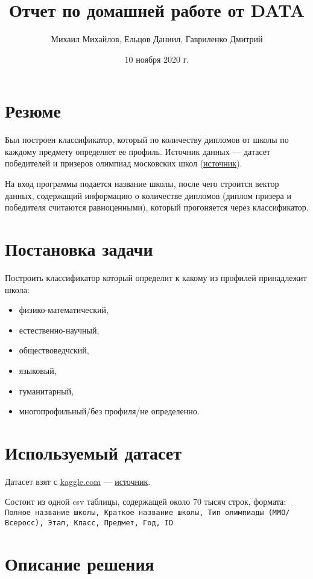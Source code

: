 \documentclass{article}
\title{Отчет по домашней работе от DATA}
\author{Михаил Михайлов, Ельцов Даниил, Гавриленко Дмитрий}
\date{10 ноября 2020 г.}
\begin{document}
\maketitle
\tableofcontents

\section*{Резюме}
Был построен классификатор, который по количеству дипломов от школы по каждому предмету определяет ее профиль. Источник данных --- датасет победителей и призеров олимпиад московских школ (\href{https://www.kaggle.com/romazepa/moscow-schools-winners-of-educational-olympiads}{источник}). 

На вход программы подается название школы, после чего строится вектор данных, содержащий информацию о количестве дипломов (диплом призера и победителя считаются равноценными), который прогоняется через классификатор. 

\newpage
\section{Постановка задачи}
Построить классификатор который определит к какому из профилей принадлежит школа:
\begin{itemize}
    \item физико-математический,
    \item естественно-научный,
    \item обществоведчский,
    \item языковый,
    \item гуманитарный,
    \item многопрофильный/без профиля/не определенно.
\end{itemize}
\section{Используемый датасет}
Датасет взят с \url{kaggle.com} --- \href{https://www.kaggle.com/romazepa/moscow-schools-winners-of-educational-olympiads}{источник}.

Состоит из одной csv таблицы, содержащей около 70 тысяч строк, формата: \\
\small{\texttt{Полное название школы, Краткое название школы, Тип олимпиады (ММО/Всеросс), Этап, Класс, Предмет, Год, ID}}

\section{Описание решения}
\end{document}
